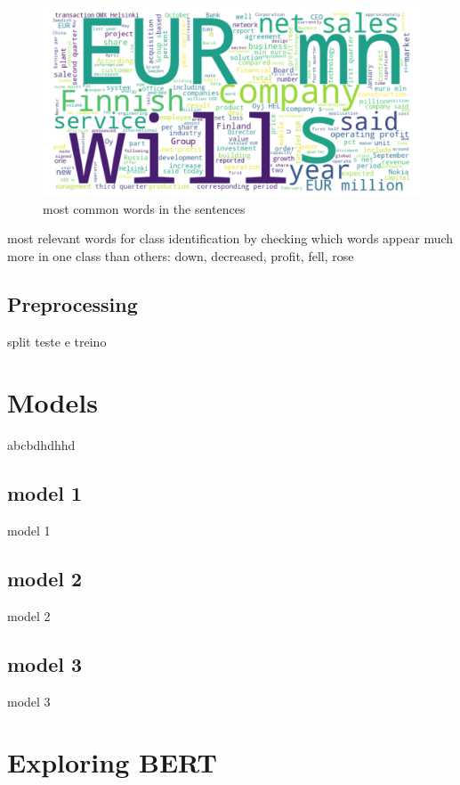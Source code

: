 \documentclass[conference]{IEEEtran}
\begin{document}
\begin{figure}[H]
    \centering
    \includegraphics[width=1\linewidth]{assets/word_cloud_75agree.png}
    \caption{most common words in the sentences}
    \label{fig:word_cloud_75agree}
\end{figure}

most relevant words for class identification by checking which words appear much more in one class than others: down, decreased, profit, fell, rose


\subsection{Preprocessing}

split teste e treino

\section{Models}

abcbdhdhhd

\subsection{model 1}

model 1


\subsection{model 2}

model 2

\subsection{model 3}

model 3

\section{Exploring BERT}
\end{document}
